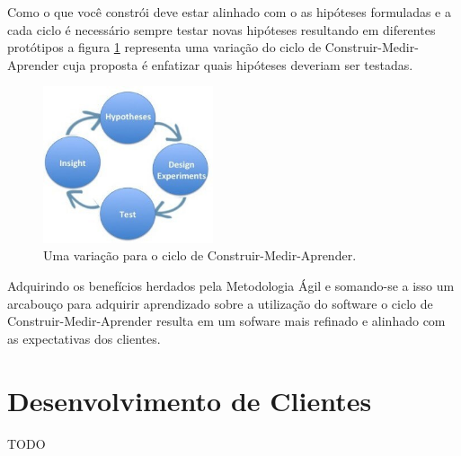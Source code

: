 \par Como o que você constrói deve estar alinhado com o as hipóteses formuladas e a cada ciclo é necessário sempre testar novas hipóteses resultando em diferentes protótipos a figura \ref{fig:hypotheses-experiment} representa uma variação do ciclo de Construir-Medir-Aprender cuja proposta é enfatizar quais hipóteses deveriam ser testadas.
\begin{figure}[htb]
\centering
\includegraphics[width=5cm]{figuras/hypotheses-experiment}
\caption{\label{fig:hypotheses-experiment} Uma variação para o ciclo de Construir-Medir-Aprender.}
\end{figure}
\par Adquirindo os benefícios herdados pela Metodologia Ágil e somando-se a isso um arcabouço para adquirir aprendizado sobre a utilização do software o ciclo de Construir-Medir-Aprender resulta em um sofware mais refinado e alinhado com as expectativas dos clientes.

\section{Desenvolvimento de Clientes}
TODO
